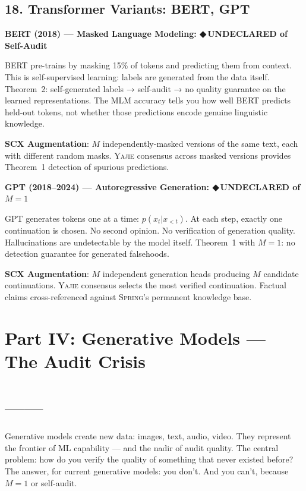 \documentclass[12pt,a4paper]{article}
\theoremstyle{definition}
\newcommand{\guilty}{{\color{guiltycolor}\textbf{◆\,UNDECLARED}}}
\newcommand{\Yajie}{\textsc{Yajie}}
\newcommand{\Spring}{\textsc{Spring}}
\newcommand{\auditHeader}[1]{\medskip\noindent\textbf{\large #1}\medskip}
\begin{document}
\subsection{18. Transformer Variants: BERT, GPT }

\auditHeader{BERT (2018) — Masked Language Modeling: \guilty{} of Self-Audit}

BERT pre-trains by masking 15\% of tokens and predicting them from context. This is self-supervised learning: labels are generated from the data itself. Theorem~2: self-generated labels → self-audit → no quality guarantee on the learned representations. The MLM accuracy tells you how well BERT predicts held-out tokens, not whether those predictions encode genuine linguistic knowledge.

\textbf{SCX Augmentation}: $M$ independently-masked versions of the same text, each with different random masks. \Yajie{} consensus across masked versions provides Theorem~1 detection of spurious predictions.

\auditHeader{GPT (2018--2024) — Autoregressive Generation: \guilty{} of $M=1$}

GPT generates tokens one at a time: $p(x_t | x_{<t})$. At each step, exactly one continuation is chosen. No second opinion. No verification of generation quality. Hallucinations are undetectable by the model itself. Theorem~1 with $M=1$: no detection guarantee for generated falsehoods.

\textbf{SCX Augmentation}: $M$ independent generation heads producing $M$ candidate continuations. \Yajie{} consensus selects the most verified continuation. Factual claims cross-referenced against \Spring{}'s permanent knowledge base.

\section{Part IV: Generative Models — The Audit Crisis}
\section{——}
\label{sec:generative}

Generative models create new data: images, text, audio, video. They represent the frontier of ML capability — and the nadir of audit quality. The central problem: how do you verify the quality of something that never existed before? The answer, for current generative models: you don't. And you can't, because $M=1$ or self-audit.
\end{document}
